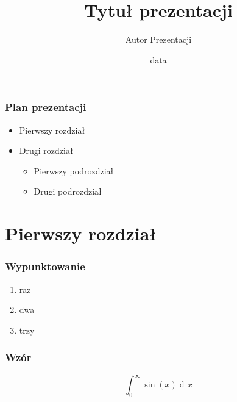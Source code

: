 \documentclass{beamer}
\title{Tytuł prezentacji}
\institute{Wydział \ldots\ Politechniki Wrocławskiej}
\author{Autor Prezentacji}
\date{data}
\begin{document}
\begin{frame}
\frametitle{Plan prezentacji}
\begin{itemize}
\item Pierwszy rozdział
\item Drugi rozdział\pause
\begin{itemize}
\item Pierwszy podrozdział
\item Drugi podrozdział
\end{itemize}
\end{itemize}
\end{frame}

\section{Pierwszy rozdział}

\begin{frame}
\frametitle{Wypunktowanie}
\begin{enumerate}
\item raz
\item dwa
\item trzy
\end{enumerate}
\end{frame}

\begin{frame}
\frametitle{Wzór}
$$\int_0^\infty \sin(x)\operatorname{d\!}{}x$$
\end{frame}
\end{document}
